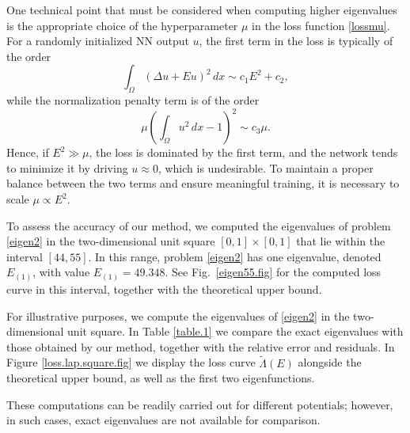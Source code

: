 \documentclass[reprint,superscriptaddress,aps,prl]{revtex4-2}
\begin{document}
One technical point that must be considered when computing higher eigenvalues is the appropriate choice of the hyperparameter $\mu$ in the loss function \eqref{lossmu}. For a randomly initialized NN output $u$, the first term in the loss is typically of the order
$$
\int_\Omega (\Delta u + E u)^2\, dx \sim c_1 E^2 + c_2,
$$
while the normalization penalty term is of the order
$$
\mu \left( \int_\Omega u^2\, dx - 1 \right)^2 \sim c_3 \mu.
$$
Hence, if $E^2 \gg \mu$, the loss is dominated by the first term, and the network tends to minimize it by driving $u \approx 0$, which is undesirable. To maintain a proper balance between the two terms and ensure meaningful training, it is necessary to scale $\mu \propto E^2 $.

To assess the accuracy of our method, we computed the eigenvalues of problem \eqref{eigen2} in the two-dimensional unit square $[0,1]\times[0,1]$ that lie within the interval $[44, 55]$. In this range, problem \eqref{eigen2} has one eigenvalue, denoted $E_{(1)}$, with value $E_{(1)} = 49.348$. See Fig.~\ref{eigen55.fig} for the computed loss curve in this interval, together with the theoretical upper bound.




 
For illustrative purposes, we compute the eigenvalues of \eqref{eigen2} in the two-dimensional unit square.   In Table \ref{table.1} we compare the exact eigenvalues with those obtained by our method, together with the relative error   and   residuals. In Figure \ref{loss.lap.square.fig} we display the loss curve $\tilde \Lambda (E)$ alongside the theoretical upper bound, as well as the first two eigenfunctions.

These computations can be readily carried out for different potentials; however, in such cases, exact eigenvalues are not available for comparison.
\end{document}
